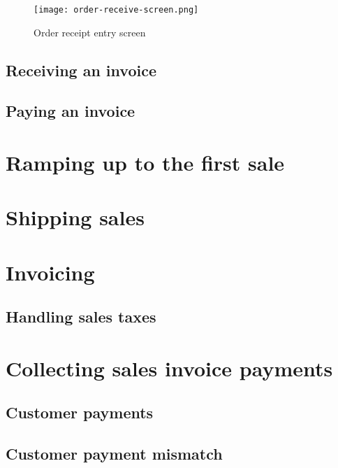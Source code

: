 \begin{figure}[h]
\centering
\texttt{[image: order-receive-screen.png]}
\caption{Order receipt entry screen}
\label{fig:order-receive-screen}
\end{figure}



\section{Receiving an invoice}

\section{Paying an invoice}


\chapter{Ramping up to the first sale}
\label{cha:ramping-up-to-the-first-sale}


\chapter{Shipping sales}
\label{cha:shipping-sales}

\chapter{Invoicing}
\label{cha:invoicing}

\section{Handling sales taxes}



% 


\chapter{Collecting sales invoice payments}
\label{cha:customer-payments}

\section{Customer payments}

\section{Customer payment mismatch}

